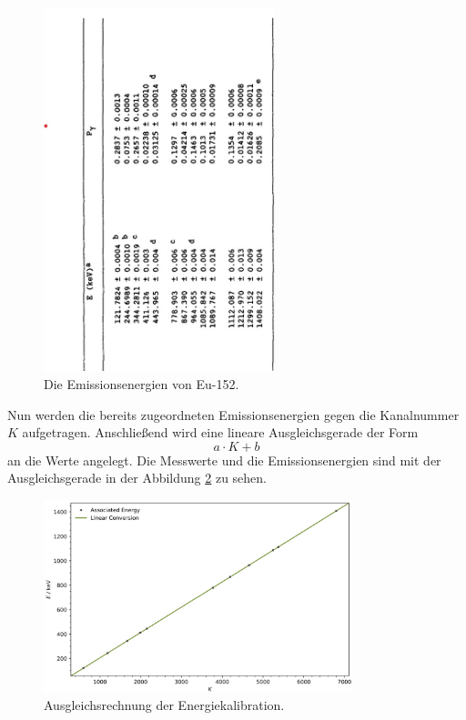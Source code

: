 \begin{figure}[H]
    \centering
    \includegraphics[angle=270,width=0.6\textwidth]{content/grafik/euenergien.jpg}
    \caption{Die Emissionsenergien von Eu-152. \cite{Kalibration}}
    \label{fig:euE}
\end{figure}

Nun werden die bereits zugeordneten Emissionsenergien gegen die Kanalnummer $K$ aufgetragen.
Anschließend wird eine lineare Ausgleichsgerade der Form 
\begin{equation*}
    a \cdot K + b
\end{equation*}
an die Werte angelegt.
Die Messwerte und die Emissionsenergien sind mit der Ausgleichsgerade in der Abbildung \ref{fig:plot2} zu sehen.

\begin{figure}[H]
    \centering
    \includegraphics[width=0.8\textwidth]{content/plots/plot2.jpg}
    \caption{Ausgleichsrechnung der Energiekalibration.}
    \label{fig:plot2}
\end{figure}

